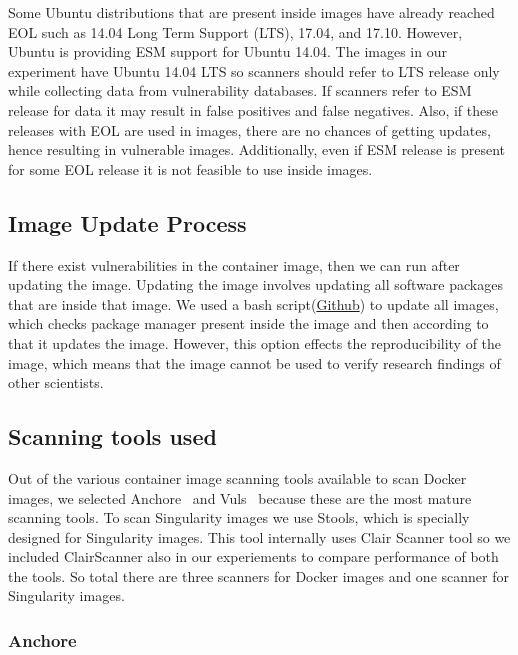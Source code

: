 \documentclass[a4paper,num-refs]{oup-contemporary}
\begin{document}
Some Ubuntu distributions that are present inside images have already reached EOL such as 14.04 Long Term Support (LTS),
17.04, and 17.10. However, Ubuntu is providing ESM support for Ubuntu 14.04. The images in our experiment have Ubuntu 14.04 LTS so scanners should refer
to LTS release only while collecting data from vulnerability databases. If scanners refer to ESM release for data it may result
in false positives and false negatives.
Also, if these releases with EOL are used in images, there are no chances of getting updates, hence
resulting in vulnerable images. Additionally, even if ESM release is present for some EOL release it is
not feasible to use inside images. 

\subsection{Image Update Process}

If there exist vulnerabilities in the container image, then we can
run after updating the
image. Updating the image involves updating all software packages that are
inside that image. We used a bash script(\href{https://github.com/kaurbhupinder/Vulnerability-Analysis}{Github}) 
to update all images, which checks
package manager present inside the image and then according to that it
updates the image. However, this option effects the reproducibility
of the image, which means that the image cannot be used to verify research
findings of other scientists.


\subsection{Scanning tools used}

Out of the various container image scanning tools available to scan Docker images,
we selected Anchore~\cite{github_2019}
and Vuls~\cite{future-architect_2019} because these are the most mature scanning tools. To scan Singularity images
we use Stools, which is specially designed for Singularity images. This tool internally uses
Clair Scanner tool so we included ClairScanner also in our experiements to compare
performance of both the tools. So total there are three scanners for Docker images
and one scanner for Singularity images.

\subsubsection{Anchore}
\end{document}
